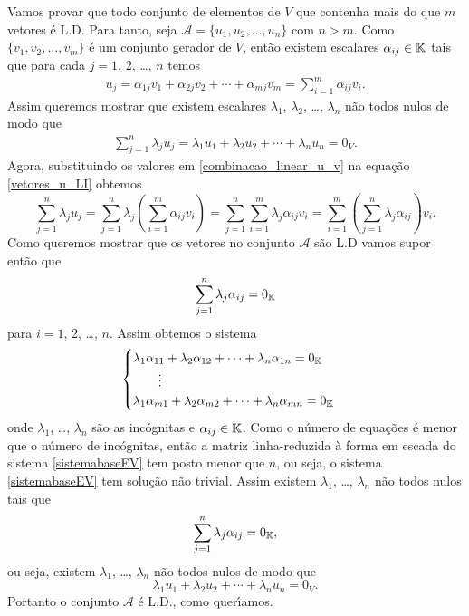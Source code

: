 \begin{prova}
	Vamos provar que todo conjunto de elementos de $V$ que contenha mais do que $m$ vetores \'e L.D. Para tanto, seja $\mathcal{A} = \{u_1, u_2, \dots, u_n\}$ com $n > m$. Como $\{v_1, v_2, \dots, v_m\}$ \'e um conjunto gerador de $V$, ent\~ao existem escalares $\alpha_{ij} \in \mathbb{K}$ tais que para cada $j = 1$, 2, \dots, $n$ temos
	\begin{align}\label{combinacao_linear_u_v}
		u_j = \alpha_{1j}v_1 + \alpha_{2j}v_2 + \cdots + \alpha_{mj}v_m = \sum_{i = 1}^m\alpha_{ij}v_i.
	\end{align}
	Assim queremos mostrar que existem escalares $\lambda_1$, $\lambda_2$, \dots, $\lambda_n$ n\~ao todos nulos de modo que
	\begin{align}\label{vetores_u_LI}
		\sum_{j = 1}^n \lambda_ju_j = \lambda_1 u_1 + \lambda_2 u_2 + \cdots + \lambda_n u_n = 0_V.
	\end{align}
	Agora, substituindo os valores em \eqref{combinacao_linear_u_v} na equação \eqref{vetores_u_LI} obtemos
	\[
		\sum_{j = 1}^n\lambda_ju_j = \sum_{j = 1}^n\lambda_j\left(\sum_{i = 1}^m\alpha_{ij}v_i\right) = \sum_{j = 1}^n\sum_{i = 1}^m\lambda_j\alpha_{ij}v_i = \sum_{i = 1}^m\left(\sum_{j = 1}^n\lambda_j\alpha_{ij}\right)v_i.
	\]
	Como queremos mostrar que os vetores no conjunto $\mathcal{A}$ são L.D vamos supor então que
	\[
		\sum_{j = 1}^n\lambda_j\alpha_{ij} = 0_{\mathbb{K}}
	\]
	para $i = 1$, 2, \dots, $n$. Assim obtemos o sistema
	\begin{equation}\label{sistemabaseEV}
		\begin{cases}
			\lambda_1\alpha_{11} + \lambda_2\alpha_{12} + \cdots + \lambda_n\alpha_{1n} = 0_{\mathbb{K}}\\
			\qquad \vdots\\
			\lambda_1\alpha_{m1} + \lambda_2\alpha_{m2} + \cdots + \lambda_n\alpha_{mn} = 0_{\mathbb{K}}\\
		\end{cases}
	\end{equation}
	onde $\lambda_1$, \dots, $\lambda_n$ s\~ao as inc\'ognitas e $\alpha_{ij} \in \mathbb{K}$. Como o n\'umero de equa\c{c}\~oes \'e menor que o n\'umero de inc\'ognitas, ent\~ao a matriz linha-reduzida \`a forma em escada do sistema \eqref{sistemabaseEV} tem posto menor que $n$, ou seja, o sistema \eqref{sistemabaseEV} tem solu\c{c}\~ao n\~ao trivial. Assim existem $\lambda_1$, \dots, $\lambda_n$ n\~ao todos nulos tais que
	\[
		\sum_{j = 1}^n\lambda_j\alpha_{ij} = 0_{\mathbb{K}},
	\]
	ou seja, existem $\lambda_1$, \dots, $\lambda_n$ n\~ao todos nulos de modo que
	\[
		\lambda_1 u_1 + \lambda_2 u_2 + \cdots + \lambda_n u_n = 0_V.
	\]
	Portanto o conjunto $\mathcal{A}$ \'e L.D., como quer{\'\i}amos.
\end{prova}

